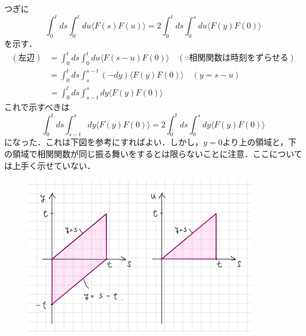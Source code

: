 \documentclass{jsarticle}
\numberwithin{equation}{section}
\theoremstyle{definition}
\begin{document}
つぎに
\begin{equation}
  \int_0^t ds \int_0^t du \langle F(s) F(u) \rangle = 2 \int_0^t ds \int_0^s du \langle F(y) F(0) \rangle
\end{equation}
を示す．
\begin{align}
  (\text{左辺}) &= \int_0^t ds \int_0^t du \langle F(s-u) F(0) \rangle \quad (\because \text{相関関数は時刻をずらせる}) \\
  &= \int_0^t ds \int_s^{s-t} (-dy) \langle F(y) F(0) \rangle \quad (y = s - u) \\
  &= \int_0^t ds \int_{s-t}^s dy \langle F(y) F(0) \rangle
\end{align}
これで示すべきは
\begin{equation}
  \int_0^t ds \int_{s-t}^s dy \langle F(y) F(0) \rangle = 2 \int_0^t ds \int_0^s dy \langle F(y) F(0) \rangle
\end{equation}
になった．これは下図を参考にすればよい．しかし，$y = 0$より上の領域と，下の領域で相関関数が同じ振る舞いをするとは限らないことに注意．ここについては上手く示せていない．

\begin{figure}[H]
  \begin{center}  
  \includegraphics[width=10cm]{int_inv.jpg}  
  \end{center}
\end{figure}
\end{document}
